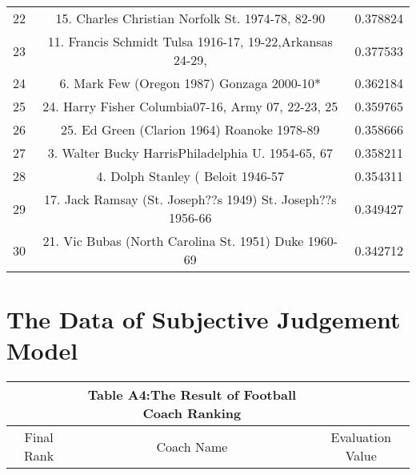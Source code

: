 \documentclass{mcmthesis}
\begin{document}
\begin{appendices}
\begin{longtable}{ccc}
    22    & 15. Charles Christian Norfolk St. 1974-78, 82-90 & 0.378824 \\
    23    & 11. Francis Schmidt Tulsa 1916-17, 19-22,Arkansas 24-29,  & 0.377533 \\
    24    & 6. Mark Few (Oregon 1987) Gonzaga 2000-10* & 0.362184 \\
    25    & 24. Harry Fisher  Columbia07-16, Army 07, 22-23, 25  & 0.359765 \\
    26    & 25. Ed Green (Clarion 1964) Roanoke 1978-89 & 0.358666 \\
    27    & 3. Walter Bucky HarrisPhiladelphia U. 1954-65, 67 & 0.358211 \\
    28    & 4. Dolph Stanley ( Beloit 1946-57 & 0.354311 \\
    29    & 17. Jack Ramsay (St. Joseph??s 1949) St. Joseph??s 1956-66  & 0.349427 \\
    30    & 21. Vic Bubas (North Carolina St. 1951) Duke 1960-69  & 0.342712 \\
\end{longtable}

\section{The Data of Subjective Judgement Model }

\begin{longtable}{ccc}
 &Table A4:The Result of Football Coach Ranking&\\
 \hline
Final Rank & Coach Name & Evaluation Value\\
\hline
\endhead


\end{longtable}
\end{appendices}
\end{document}
